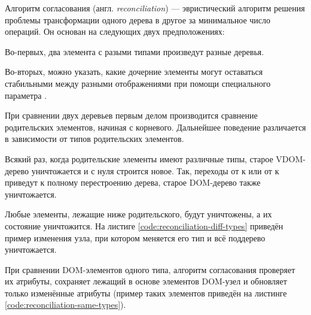 
Алгоритм согласования (англ. \textit{reconciliation}) \cite{reconciliation} --- эвристический алгоритм решения проблемы трансформации одного дерева в другое за минимальное число операций.
Он основан на следующих двух предположениях:

Во-первых, два элемента с разыми типами произведут разные деревья.

Во-вторых, можно указать, какие дочерние элементы могут оставаться стабильными между разными отображениями при помощи специального параметра .

При сравнении двух деревьев первым делом производится сравнение родительских элементов, начиная с корневого.
Дальнейшее поведение различается в зависимости от типов родительских элементов.

Всякий раз, когда родительские элементы имеют различные типы, старое VDOM-дерево уничтожается и с нуля строится новое.
Так, переходы от  к  или от  к  приведут к полному перестроению дерева, старое DOM-дерево также уничтожается.

Любые элементы, лежащие ниже родительского, будут уничтожены, а их состояние уничтожится.
На листиге \ref{code:reconciliation-diff-types} приведён пример изменения узла, при котором меняется его тип и всё поддерево уничтожается.

\clearpage
{}

При сравнении DOM-элементов одного типа, алгоритм согласования проверяет их атрибуты, сохраняет лежащий в основе элементов DOM-узел и обновляет только изменённые атрибуты (пример таких элементов приведён на листинге \ref{code:reconciliation-same-types}).


